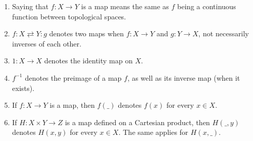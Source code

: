 \documentclass[12pt,oneside]{book}
\begin{document}
\begin{enumerate}
	\item Saying that $f:X\to Y$ is a map means the same as $f$ being a continuous function between 
    topological spaces.
    \item $f:X \rightleftarrows Y:g$ denotes two maps when $f:X\to Y$ and $g:Y\to X$, not necessarily 
    inverses of each other.
	\item $1:X\to X$ denotes the identity map on $X$.
	\item $f^{-1}$ denotes the preimage of a map $f$, as well as its inverse map (when it exists).
	\item If $f:X\to Y$ is a map, then $f(\_)$ denotes $f(x)$ for every $x\in X$.
	\item If $H:X\times Y\to Z$ is a map defined on a Cartesian product, then $H(\_,y)$ denotes $H(x,y)$ 
    for every $x\in X$. The same applies for $H(x,\_)$.
    

\end{enumerate}
\end{document}
